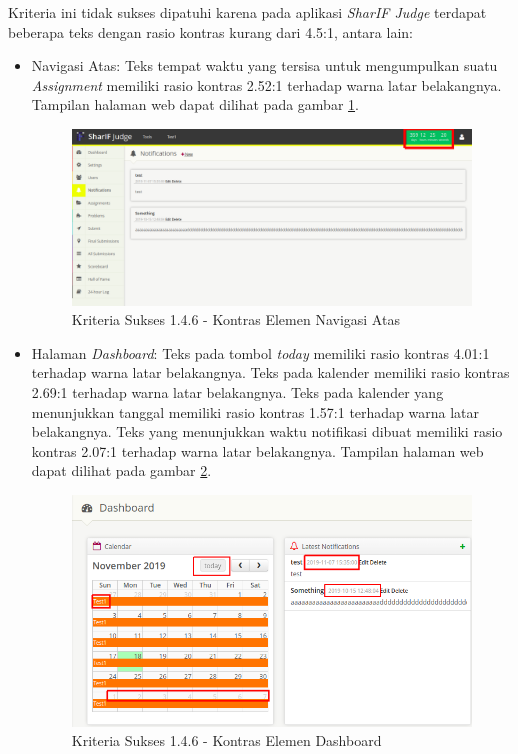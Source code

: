 \documentclass[a4paper,twoside]{article}
\begin{document}
\begin{enumerate}
		Kriteria ini tidak sukses dipatuhi karena pada aplikasi \textit{SharIF Judge} terdapat beberapa teks dengan rasio kontras kurang dari 4.5:1, antara lain:
		\begin{itemize}
			\item Navigasi Atas: Teks tempat waktu yang tersisa untuk mengumpulkan suatu \textit{Assignment} memiliki rasio kontras 2.52:1 terhadap warna latar belakangnya. Tampilan halaman web dapat dilihat pada gambar \ref{fig:kepatuhan_1_4_6_navigasi_atas}.
			\begin{figure}[H]
				\centering  
				\includegraphics[scale=0.25]{kepatuhan_1_4_6_navigasi_atas}  
				\caption[Kriteria Sukses 1.4.6 - Kontras Elemen Navigasi Atas]{Kriteria Sukses 1.4.6 - Kontras Elemen Navigasi Atas} 
				\label{fig:kepatuhan_1_4_6_navigasi_atas} 
			\end{figure}
			
			\item Halaman \textit{Dashboard}: Teks pada tombol \textit{today} memiliki rasio kontras 4.01:1 terhadap warna latar belakangnya. Teks pada kalender memiliki rasio kontras 2.69:1 terhadap warna latar belakangnya. Teks pada kalender yang menunjukkan tanggal memiliki rasio kontras 1.57:1 terhadap warna latar belakangnya. Teks yang menunjukkan waktu notifikasi dibuat memiliki rasio kontras 2.07:1 terhadap warna latar belakangnya. Tampilan halaman web dapat dilihat pada gambar \ref{fig:kepatuhan_1_4_6_dashboard}.
			\begin{figure}[H]
				\centering  
				\includegraphics[scale=0.5]{kepatuhan_1_4_6_dashboard}  
				\caption[Kriteria Sukses 1.4.6 - Kontras Elemen Dashboard]{Kriteria Sukses 1.4.6 - Kontras Elemen Dashboard} 
				\label{fig:kepatuhan_1_4_6_dashboard} 
			\end{figure}
			

\end{itemize}
\end{enumerate}
\end{document}
